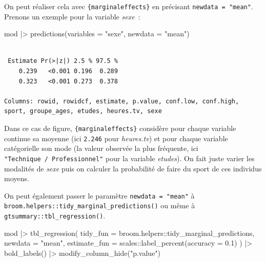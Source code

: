 \documentclass[
  letterpaper,
  DIV=11,
  numbers=noendperiod,
  oneside]{scrreprt}
\newenvironment{Shaded}{\begin{snugshade}}{\end{snugshade}}
\newcommand{\AttributeTok}[1]{\textcolor[rgb]{0.40,0.45,0.13}{#1}}
\newcommand{\FloatTok}[1]{\textcolor[rgb]{0.68,0.00,0.00}{#1}}
\newcommand{\FunctionTok}[1]{\textcolor[rgb]{0.28,0.35,0.67}{#1}}
\newcommand{\NormalTok}[1]{\textcolor[rgb]{0.00,0.23,0.31}{#1}}
\newcommand{\SpecialCharTok}[1]{\textcolor[rgb]{0.37,0.37,0.37}{#1}}
\newcommand{\StringTok}[1]{\textcolor[rgb]{0.13,0.47,0.30}{#1}}
\begin{document}
On peut réaliser cela avec \texttt{\{marginaleffects\}} en précisant
\texttt{newdata\ =\ "mean"}. Prenons un exemple pour la variable
\emph{sexe}~:

\begin{Shaded}
\begin{Highlighting}[]
\NormalTok{mod }\SpecialCharTok{|\textgreater{}} \FunctionTok{predictions}\NormalTok{(}\AttributeTok{variables =} \StringTok{"sexe"}\NormalTok{, }\AttributeTok{newdata =} \StringTok{"mean"}\NormalTok{)}
\end{Highlighting}
\end{Shaded}

\begin{verbatim}

 Estimate Pr(>|z|) 2.5 % 97.5 %
    0.239   <0.001 0.196  0.289
    0.323   <0.001 0.273  0.378

Columns: rowid, rowidcf, estimate, p.value, conf.low, conf.high, sport, groupe_ages, etudes, heures.tv, sexe 
\end{verbatim}

Dans ce cas de figure, \texttt{\{marginaleffects\}} considère pour
chaque variable continue sa moyenne (ici \texttt{2.246} pour
\emph{heures.tv}) et pour chaque variable catégorielle son mode (la
valeur observée la plus fréquente, ici
\texttt{"Technique\ /\ Professionnel"} pour la variable \emph{etudes}).
On fait juste varier les modalités de \emph{sexe} puis on calculer la
probabilité de faire du sport de ces individus moyens.

On peut également passer le paramètre \texttt{newdata\ =\ "mean"} à
\texttt{broom.helpers::tidy\_marginal\_predictions()} ou même à
\texttt{gtsummary::tbl\_regression()}.

\begin{Shaded}
\begin{Highlighting}[]
\NormalTok{mod }\SpecialCharTok{|\textgreater{}} 
  \FunctionTok{tbl\_regression}\NormalTok{(}
    \AttributeTok{tidy\_fun =}\NormalTok{ broom.helpers}\SpecialCharTok{::}\NormalTok{tidy\_marginal\_predictions,}
    \AttributeTok{newdata =} \StringTok{"mean"}\NormalTok{,}
    \AttributeTok{estimate\_fun =}\NormalTok{ scales}\SpecialCharTok{::}\FunctionTok{label\_percent}\NormalTok{(}\AttributeTok{accuracy =} \FloatTok{0.1}\NormalTok{)}
\NormalTok{  ) }\SpecialCharTok{|\textgreater{}} 
  \FunctionTok{bold\_labels}\NormalTok{() }\SpecialCharTok{|\textgreater{}} 
  \FunctionTok{modify\_column\_hide}\NormalTok{(}\StringTok{"p.value"}\NormalTok{)}
\end{Highlighting}
\end{Shaded}
\end{document}
